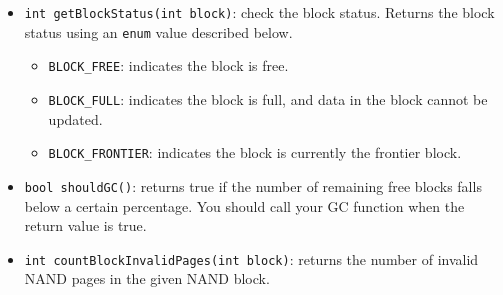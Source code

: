 \documentclass[11pt]{article}
\begin{document}
\begin{itemize}
    \item \texttt{int getBlockStatus(int block)}: check the block status. Returns the block status using an \texttt{enum} value described below.
    \begin{itemize}
        \item \texttt{BLOCK\_FREE}: indicates the block is free.
        \item \texttt{BLOCK\_FULL}: indicates the block is full, and data in the block cannot be updated.
        \item \texttt{BLOCK\_FRONTIER}: indicates the block is currently the frontier block.
    \end{itemize}
    
    \item \texttt{bool shouldGC()}: returns true if the number of remaining free blocks falls below a certain percentage. You should call your GC function when the return value is true.
    \item \texttt{int countBlockInvalidPages(int block)}: returns the number of invalid NAND pages in the given NAND block.
\end{itemize}
\end{document}
